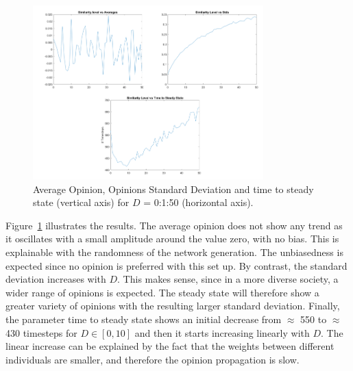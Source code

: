 \begin{figure}[!t]
	\centering
	\includegraphics[width=3.5in]{Figures/diversity_results.png}
	\caption{Average Opinion, Opinions Standard Deviation and time to steady state (vertical axis) for $D$ = 0:1:50 (horizontal axis).}
	\label{pics:diversityresults}
\end{figure}
Figure~\ref{pics:diversityresults} illustrates the results. The average opinion does not show any trend as it oscillates with a small amplitude around the value zero, with no bias. This is explainable with the randomness of the network generation. The unbiasedness is expected since no opinion is preferred with this set up. By contrast, the standard deviation increases with $D$. This makes sense, since in a more diverse society, a wider range of opinions is expected. The steady state will therefore show a greater variety of opinions with the resulting larger standard deviation. Finally, the parameter time to steady state shows an initial decrease from $\approx$ 550 to $\approx$ 430 timesteps for $D \in [0,10]$ and then it starts increasing linearly with $D$. The linear increase can be explained by the fact that the weights between different individuals are smaller, and therefore the opinion propagation is slow.

